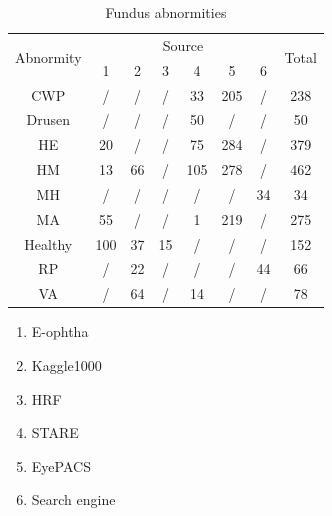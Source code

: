\documentclass{article}
\begin{document}
	\begin{minipage}[t]{0.6\linewidth}
		{
			\fontsize{9}{12}\selectfont
			{
				\begin{longtable}{cccccccc}
					\caption{Fundus abnormities}
					\label{tb:Fundus_source}\\
					\toprule
					\multirow{2}{*}{Abnormity}&\multicolumn{6}{c}{Source}&\multirow{2}{*}{Total}\\
					&1&2&3&4&5&6&\\
					\midrule
					CWP    &/  &/ &/ &33 &205&/ &238\\
					Drusen &/  &/ &/ &50 &/  &/ &50 \\     
					HE     &20 &/ &/ &75 &284&/ &379\\ 
					HM     &13 &66&/ &105&278&/ &462\\     
					MH     &/  &/ &/ &/  &/  &34&34 \\        
					MA     &55 &/ &/ &1  &219&/ &275\\
					Healthy&100&37&15&/  &/  &/ &152\\      
					RP     &/  &22&/ &/  &/  &44&66 \\         
					VA     &/  &64&/ &14 &/  &/ &78 \\
					
					\bottomrule
				\end{longtable}
				
				\vspace{1cm}
				\begin{enumerate}
					
					\item E-ophtha
					\vspace{-0.2cm}
					
					\item Kaggle1000
					\vspace{-0.2cm}
					
					\item HRF
					\vspace{-0.2cm}
					
					\item STARE
					\vspace{-0.2cm}
					
					\item EyePACS
					\vspace{-0.2cm}
					
					\item Search engine
					\vspace{-0.2cm}
					
				\end{enumerate}
				
				\vspace{0.5cm}
			}
		}
	\end{minipage}
	
\end{document}
